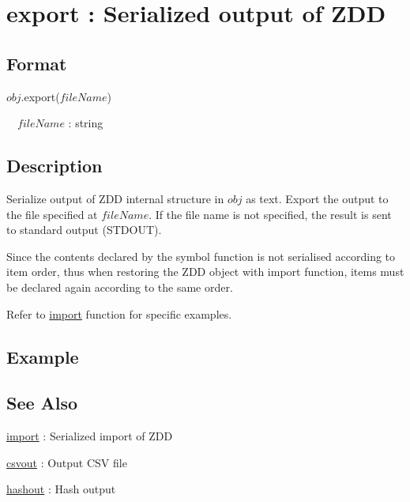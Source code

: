 
\section{export : Serialized output of ZDD\label{sect:export}}
\subsection*{Format}
$obj$.export($fileName$)

~~$fileName$ : string

\subsection*{Description}
Serialize output of ZDD internal structure in $obj$ as text. 
Export the output to the file specified at $fileName$. 
If the file name is not specified, the result is sent to standard output (STDOUT). 

Since the contents declared by the symbol function is not serialised according to item order, thus when restoring the ZDD object with import function, items must be declared again according to the same order. 

Refer to \hyperref[sect:import]{import} function for specific examples. 

\subsection*{Example}


\subsection*{See Also}
\hyperref[sect:import]{import} : Serialized import of ZDD

\hyperref[sect:csvout]{csvout} : Output CSV file  

\hyperref[sect:hashout]{hashout} : Hash output
